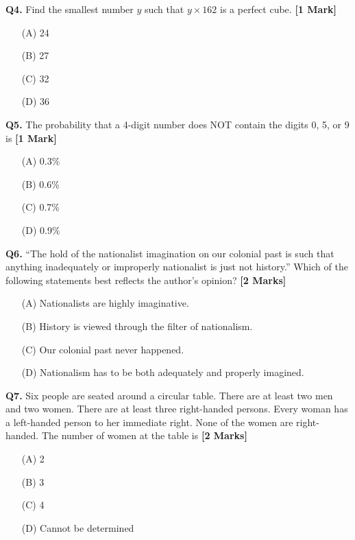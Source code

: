 \documentclass[11pt]{article}
\newcommand{\questiona}[2]{
    \noindent\textbf{Q#2.} #1 \hfill \textbf{[1 Mark]}
}
\newcommand{\questionb}[2]{
    \noindent\textbf{Q#2.} #1 \hfill \textbf{[2 Marks]}
}
\begin{document}
\questiona{Find the smallest number \( y \) such that \( y \times 162 \) is a perfect cube.}{4}
\begin{enumerate}
    \item[(A)] 24  
    \item[(B)] 27  
    \item[(C)] 32  
    \item[(D)] 36  
\end{enumerate}
\vspace{0.5cm}

\questiona{The probability that a 4-digit number does NOT contain the digits 0, 5, or 9 is}{5}
\begin{enumerate}
    \item[(A)] 0.3\%  
    \item[(B)] 0.6\%  
    \item[(C)] 0.7\%  
    \item[(D)] 0.9\%  
\end{enumerate}
\vspace{0.5cm}

\questionb{“The hold of the nationalist imagination on our colonial past is such that anything inadequately or improperly nationalist is just not history.” Which of the following statements best reflects the author’s opinion?}{6}
\begin{enumerate}
    \item[(A)] Nationalists are highly imaginative.  
    \item[(B)] History is viewed through the filter of nationalism.  
    \item[(C)] Our colonial past never happened.  
    \item[(D)] Nationalism has to be both adequately and properly imagined.  
\end{enumerate}
\vspace{0.5cm}

\questionb{Six people are seated around a circular table. There are at least two men and two women. There are at least three right-handed persons. Every woman has a left-handed person to her immediate right. None of the women are right-handed. The number of women at the table is}{7}
\begin{enumerate}
    \item[(A)] 2  
    \item[(B)] 3  
    \item[(C)] 4  
    \item[(D)] Cannot be determined  
\end{enumerate}
\vspace{0.5cm}
\end{document}
